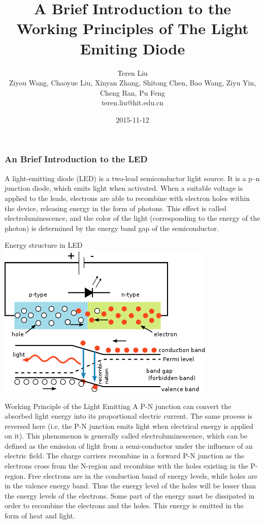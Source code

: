 \documentclass[english]{beamer}
\title{\textbf{A Brief Introduction to the Working Principles of The Light Emiting Diode}}
\author[Teren]{Teren Liu\\ Ziyou Wang, Chaoyue Liu, Xinyan Zhang, Shitong Chen, Bao Wang, Ziyu Yin, Cheng Ran,                Pu Feng\\{teren.liu@hit.edu.cn}}
\date{2015-11-12}
\begin{document}
\maketitle

\begin{frame}
	\frametitle{An Brief Introduction to the LED}
	A light-emitting diode (LED) is a two-lead semiconductor light source. It is a p–n junction diode, which emits light when activated. When a suitable voltage is applied to the leads, electrons are able to recombine with electron holes within the device, releasing energy in the form of photons. This effect is called electroluminescence, and the color of the light (corresponding to the energy of the photon) is determined by the energy band gap of the semiconductor.
\end{frame}
\begin{frame}{Energy structure in LED}
	\includegraphics[height=0.6\textwidth]{f1.png}
\end{frame}
\begin{frame}{Working Principle of the Light Emitting }
	A P-N junction can convert the absorbed light energy into its proportional electric current. The same process is reversed here (i.e. the P-N junction emits light when electrical energy is applied on it). This phenomenon is generally called electroluminescence, which can be defined as the emission of light from a semi-conductor under the influence of an electric field. The charge carriers recombine in a forward P-N junction as the electrons cross from the N-region and recombine with the holes existing in the P-region. Free electrons are in the conduction band of energy levels, while holes are in the valence energy band. Thus the energy level of the holes will be lesser than the energy levels of the electrons. Some part of the energy must be dissipated in order to recombine the electrons and the holes. This energy is emitted in the form of heat and light.
\end{frame}
\end{document}

